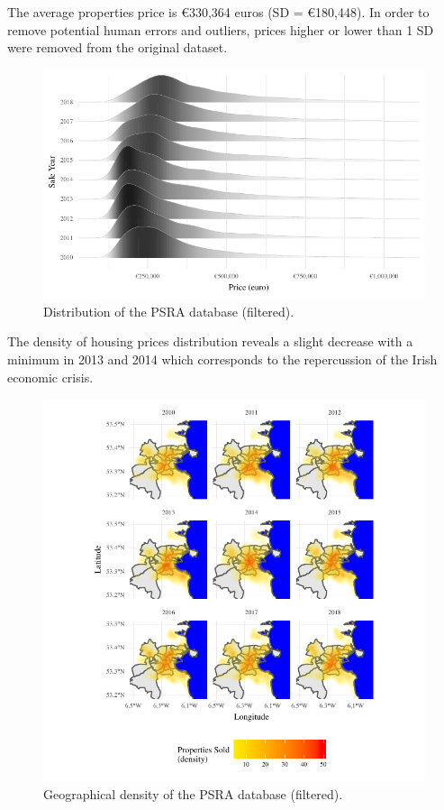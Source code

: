 \documentclass[]{elsarticle} %
\newcommand{\euro}{€}
\begin{document}
The average properties price is \euro{}330,364 euros (SD =
\euro{}180,448). In order to remove potential human errors and outliers,
prices higher or lower than 1 SD were removed from the original dataset.

\begin{figure}[H]
\includegraphics{property_price_paper_new_files/figure-latex/distrib-plot-1} \caption{Distribution of the PSRA database (filtered).}\label{fig:distrib-plot}
\end{figure}

The density of housing prices distribution reveals a slight decrease
with a minimum in 2013 and 2014 which corresponds to the repercussion of
the Irish economic crisis.

\begin{figure}[H]
\includegraphics{property_price_paper_new_files/figure-latex/density-plot-1} \caption{Geographical density of the PSRA database (filtered).}\label{fig:density-plot}
\end{figure}
\end{document}
